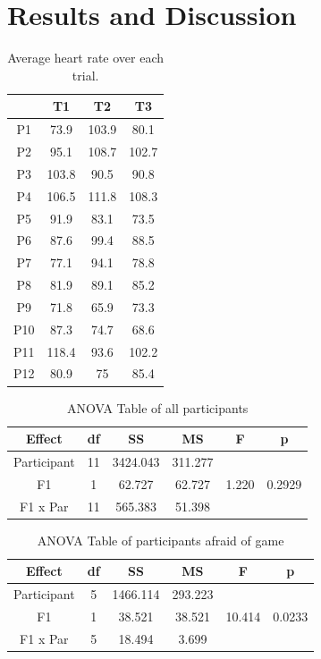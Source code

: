 \documentclass[manuscript,screen,review]{acmart}
\begin{document}
\section{Results and Discussion}
\begin{table}
    \centering
    \begin{tabular}{cccc}
    \toprule
        & T1 & T2 & T3 \\
        \midrule
        P1 & 73.9 & 103.9 & 80.1 \\
        P2 & 95.1 & 108.7 & 102.7 \\
        P3 & 103.8 & 90.5 & 90.8 \\
        P4 & 106.5 & 111.8 & 108.3 \\
        P5 & 91.9 & 83.1 & 73.5 \\
        P6 & 87.6 & 99.4 & 88.5 \\
        P7 & 77.1 & 94.1 & 78.8 \\
        P8 & 81.9 & 89.1 & 85.2 \\
        P9 & 71.8 & 65.9 & 73.3 \\
        P10 & 87.3 & 74.7 & 68.6 \\
        P11 & 118.4 & 93.6 & 102.2 \\
        P12 & 80.9 & 75 & 85.4 \\
        \bottomrule
    \end{tabular}
    \caption{Average heart rate over each trial.}
    \label{tab:averages}
\end{table}

\begin{table}[ht]
    \centering
    \begin{tabular}{|c|c|c|c|c|c|}
    \hline
    Effect        & df & SS       & MS       & F    & p      \\ \hline
    Participant   & 11 & 3424.043 & 311.277  &      &        \\ \hline
    F1            & 1  & 62.727   & 62.727   & 1.220 & 0.2929 \\ \hline
    F1 x Par      & 11 & 565.383  & 51.398   &      &        \\ \hline
    \end{tabular}
    \caption{ANOVA Table of all participants}
    \label{tab:anovaAll}
\end{table}

\begin{table}[ht]
    \centering
    \begin{tabular}{|c|c|c|c|c|c|}
    \hline
    Effect        & df & SS       & MS       & F    & p      \\ \hline
    Participant   & 5 & 1466.114 & 293.223  &      &        \\ \hline
    F1            & 1  & 38.521   & 38.521   & 10.414 & 0.0233 \\ \hline
    F1 x Par      & 5 & 18.494  & 3.699   &      &        \\ \hline
    \end{tabular}
    \caption{ANOVA Table of participants afraid of game}
    \label{tab:anovaAfraid}
\end{table}
\end{document}
